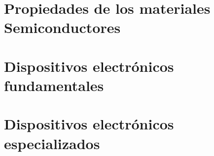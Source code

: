 \documentclass[tikz, a4paper,12pt]{book}
\begin{document}
\frontmatter
\thispagestyle{empty}  %

\tableofcontents 
\thispagestyle{empty}  %
\mainmatter
\setcounter{page}{1}
\part{Propiedades de los materiales Semiconductores}


\part{Dispositivos electrónicos fundamentales}



\part{Dispositivos electrónicos especializados}


\appendix
\thispagestyle{empty}

\end{document}
